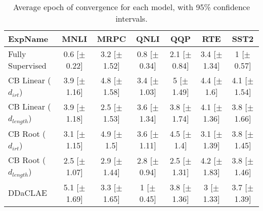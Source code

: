 \begin{table*}[ht]
\centering
\begingroup\small
\begin{tabular}{lcccccc}
  \hline
ExpName & MNLI & MRPC & QNLI & QQP & RTE & SST2 \\ 
  \hline
Fully Supervised & 0.6 [$\pm$0.22] & 3.2 [$\pm$1.52] & 0.8 [$\pm$0.34] & 2.1 [$\pm$0.84] & 3.4 [$\pm$1.34] & 1 [$\pm$0.57] \\ 
  CB Linear ($d_{irt}$) & 3.9 [$\pm$1.16] & 4.8 [$\pm$1.58] & 3.4 [$\pm$1.03] & 5 [$\pm$1.49] & 4.4 [$\pm$1.6] & 4.1 [$\pm$1.54] \\ 
  CB Linear ($d_{length}$) & 3.9 [$\pm$1.18] & 2.5 [$\pm$1.53] & 3.6 [$\pm$1.34] & 3.8 [$\pm$1.74] & 4.1 [$\pm$1.36] & 3.8 [$\pm$1.66] \\ 
  CB Root ($d_{irt}$) & 3.1 [$\pm$1.15] & 4.9 [$\pm$1.5] & 3.6 [$\pm$1.11] & 4.5 [$\pm$1.4] & 3.1 [$\pm$1.39] & 3.8 [$\pm$1.45] \\ 
  CB Root ($d_{length}$) & 2.5 [$\pm$1.07] & 2.9 [$\pm$1.44] & 2.8 [$\pm$0.94] & 2.5 [$\pm$1.31] & 4.2 [$\pm$1.83] & 3.8 [$\pm$1.46] \\ 
  DDaCLAE & 5.1 [$\pm$1.69] & 3.3 [$\pm$1.65] & 1 [$\pm$0.45] & 3.8 [$\pm$1.36] & 3 [$\pm$1.33] & 3.7 [$\pm$1.39] \\ 
   \hline
\end{tabular}
\endgroup
\caption{Average epoch of convergence for each model, with 95\% confidence intervals.} 
\label{tab:epoch_bert-False}
\end{table*}
